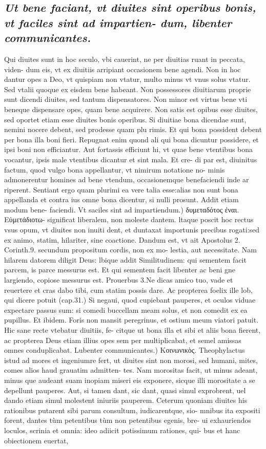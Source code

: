 \documentclass{article}
\begin{document}
\begin{pages}
\subsection*{\textit{Ut bene faciant, vt diuites sint operibus bonis, vt faciles sint ad impartien- dum, libenter communicantes. }}\pstart Qui diuites sunt in hoc seculo, vbi cauerint, ne per diuitias ruant in peccata, viden- dum eis, vt ex diuitiis arripiant occasionem bene agendi. Non in hoc dantur opes a Deo, vt quispiam non vtatur, multo minus vt vnus solus vtatur. Sed vtalii quoque ex eisdem bene habeant. Non possessores diuitiarum proprie sunt dicendi diuites, sed tantum dispensatores. Non minor est virtus bene vti beneque dispensare opes, quam bene acquirere. Non satis est opibus esse diuites, sed oportet etiam esse diuites bonis operibus. Si diuitiae bona dicendae sunt, nemini nocere debent, sed prodesse quam plu rimis. Et qui bona possident debent per bona illa boni fieri. Repugnat enim quond ali qui bona dicuntur possidere, et ipsi boni non efficiantur. Aut fortassis efficiunt hi, vt quae bene vtentibus bona vocantur, ipsis male vtentibus dicantur et sint mala. Et cre- di par est, diuinitus factum, quod vulgo bona appellantur, vt nimirum notatione no- minis admonerentur homines ad bene vtendum, occasionemque benefaciendi inde ar riperent. Sentiant ergo quam plurimi ea vere talia esse:alias non sunt bona appellanda et contra ius omne bona dicentur, si nulli prosunt. Addit etiam modum bene- faciendi.  \pend\pstart Vt saciles sint ad impartiendum.) δυμεταδότος ἐναι. Εὐμετάδιοτω- significat liberalem, non moleste dantem. ltaque poscit hoc rectus vsus opum, vt diuites non inuiti dent, et duntaxat importunis precibus rogati:sed ex animo, statim, hilariter, sine coactione. Dandum est, vt ait Apostolus 2. Corinth.9. secundum propositum cordis, non ex mo- lestia, aut necessitate. Nam hilarem datorem diligit Deus: lbique addit Similitudinem: qui sementem facit parcem, is parce messurus est. Et qui sementem facit libenter ac beni gne largiendo, copiose messurus est. Prouerbus 3.Ne dicas amico tuo, vade et reuertere et cras dabo tibi, cum statim possis dare. Ac propterea foelix ille lob, qui dicere potuit (cap.31.) Si negaui, quod cupiebant pauperes, et oculos viduae expectare passus sum: si comedi buccellam meam solus, et non comedit ex ea pupillus. Et ibidem. Foris non mansit peregrinus, et ostium meum viatori patuit. Hic sane recte vtebatur diuitiis, fe- citque ut bona illa et sibi et aliis bona fierent, ac propterea Deus etiam illius opes sem per multiplicabat, et semel amissas omnes conduplicabat.  \pend\pstart Lubenter communicantes.) Κοινωνικὸς. Theophylactus istud ad mores et ingeniumre fert, ut diuites sint non morosi, sed humani, mites, comes alios haud grauatim admitten- tes. Nam morositas facit, ut minus adeant, minus que audeant suam inopiam miseri eis exponere, sicque illi morositate a se depellunt pauperes. Aut, si tamen dant, sic dant, quasi simul exprobrent, uel dando etiam simul molestent iniuriis pauperem. Ceterum quoniam diuites his rationibus putarent sibi parum consultum, iudicarentque, sio- mnibus ita expositi forent, dantes tùm petentibus tùm non petentibus egenis, bre- ui exhauriendos loculos, scrinia et omnia: ideo adiicit potissimum rationes, qui- bus et hanc obiectionem euertat, 
\end{pages}
\end{document}
